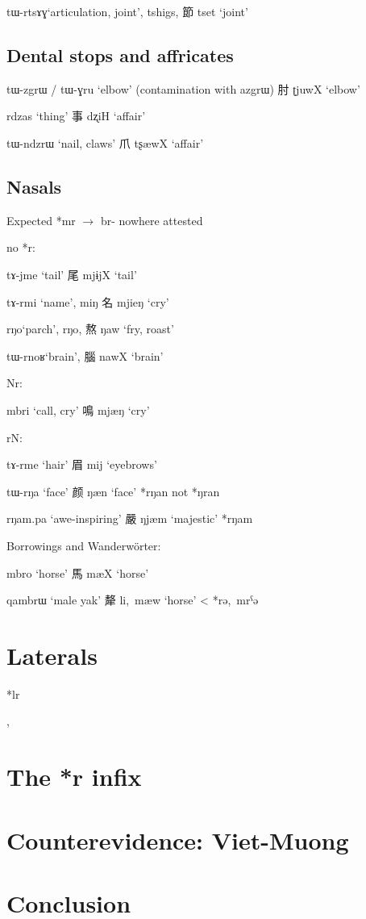 \documentclass[oldfontcommands,oneside,a4paper,11pt]{article}
\newcommand{\ipa}[1]{{\phon \mbox{#1}}} %
\newcommand{\zh}[1]{{\cn #1}}
\newcommand{\ch}[3]{\zh{#1} \ipa{#2} `#3'}
\begin{document}
\ipa{tɯ-rtsɤɣ}`articulation, joint', \ipa{tshigs}, \ch{節}{tset}{joint}

\subsection{Dental stops and affricates}
\ipa{tɯ-zgrɯ} / \ipa{tɯ-ɣru} `elbow' (contamination with \ipa{azgrɯ})  \ch{肘}{ʈjuwX}{elbow}


\ipa{rdzas} `thing' \ch{事}{dʐiH}{affair}


\ipa{tɯ-ndzrɯ} `nail, claws' \ch{爪}{tʂæwX}{affair}
\subsection{Nasals}
Expected *\ipa{mr} $\rightarrow$ \ipa{br-} nowhere attested


no *r:

\ipa{tɤ-jme} `tail' \ch{尾}{mjɨjX}{tail}

\ipa{tɤ-rmi} `name', \ipa{miŋ} \ch{名}{mjieŋ}{cry} 

\ipa{rŋo}`parch', \ipa{rŋo}, \ch{熬}{ŋaw}{fry, roast}

\ipa{tɯ-rnoʁ}`brain', \ch{腦}{nawX}{brain}

Nr:

\ipa{mbri} `call, cry' \ch{鳴}{mjæŋ}{cry}


rN:

\ipa{tɤ-rme} `hair' \ch{眉}{mij}{eyebrows}

\ipa{tɯ-rŋa} `face' \ch{颜}{ŋæn}{face} *\ipa{rŋan} not *\ipa{ŋran}

\ipa{rŋam.pa} `awe-inspiring' \ch{嚴}{ŋjæm}{majestic} *\ipa{rŋam} \citet{coblin86handlist}


Borrowings and Wanderwörter:

\ipa{mbro} `horse' \ch{馬}{mæX}{horse}

\ipa{qambrɯ} `male yak' \ch{犛}{li, mæw}{horse} < *\ipa{rə, mrˁə}


\section{Laterals}

*lr

\citet[217-225]{starostin89}, \citet[36-40]{sagart99roc}
\citet[78]{baroni14invariant}

\citet{nikitina12logophoric}

\section{The *r infix}

 \citet{sagart99roc}

\section{Counterevidence: Viet-Muong}

\section{Conclusion}




\end{document}
